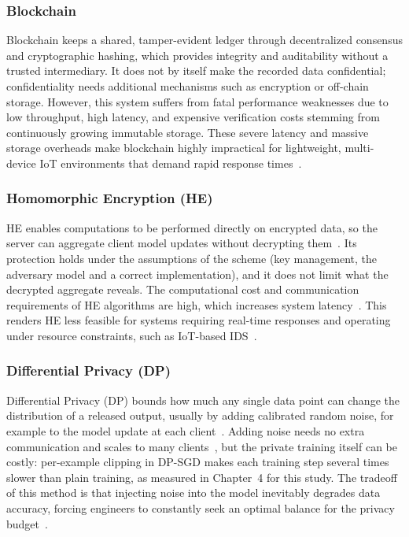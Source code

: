 \subsubsection*{Blockchain}
Blockchain keeps a shared, tamper-evident ledger through decentralized consensus and cryptographic hashing, which provides integrity and auditability without a trusted intermediary. It does not by itself make the recorded data confidential; confidentiality needs additional mechanisms such as encryption or off-chain storage. However, this system suffers from fatal performance weaknesses due to low throughput, high latency, and expensive verification costs stemming from continuously growing immutable storage. These severe latency and massive storage overheads make blockchain highly impractical for lightweight, multi-device IoT environments that demand rapid response times~\cite{vyas2024}.

\subsubsection*{Homomorphic Encryption (HE)}
HE enables computations to be performed directly on encrypted data, so the server can aggregate client model updates without decrypting them~\cite{nakayiza2026}. Its protection holds under the assumptions of the scheme (key management, the adversary model and a correct implementation), and it does not limit what the decrypted aggregate reveals. The computational cost and communication requirements of HE algorithms are high, which increases system latency~\cite{nakayiza2026}. This renders HE less feasible for systems requiring real-time responses and operating under resource constraints, such as IoT-based IDS~\cite{nakayiza2026}.

\subsubsection*{Differential Privacy (DP)}
Differential Privacy (DP) bounds how much any single data point can change the distribution of a released output, usually by adding calibrated random noise, for example to the model update at each client~\cite{ruzafa2022}. Adding noise needs no extra communication and scales to many clients~\cite{ruzafa2022}, but the private training itself can be costly: per-example clipping in DP-SGD makes each training step several times slower than plain training, as measured in Chapter~4 for this study. The tradeoff of this method is that injecting noise into the model inevitably degrades data accuracy, forcing engineers to constantly seek an optimal balance for the privacy budget~\cite{ruzafa2022}.


